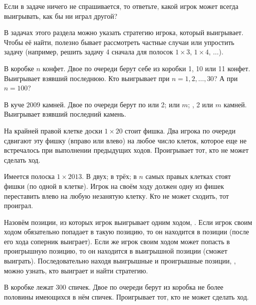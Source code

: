 \documentclass[a4paper,12pt]{article}
\begin{document}

{\small {\noindent} Если %
в задаче ничего не спрашивается, то
ответьте, какой игрок может всегда выигрывать,
как бы ни играл другой?}


{\small В задачах этого раздела можно указать стратегию
игрока, который выигрывает. Чтобы её найти, полезно бывает
рассмотреть частные случаи или упростить задачу (например, решить задачу
4 сначала для полосок $1\times3$, $1\times4$, $\dots$).
}

\vspace*{1truemm}



В коробке $n$ конфет. Двое по очереди берут себе из коробки
1, 10 или 11 конфет. Выигрывает взявший последнюю.
 Кто выигрывает при $n=1,2,\dots,30$?
  А при $n=100$?

В куче $2009$ камней. Двое по очереди берут по
 или 2;
 или $m$;
, 2 или $m$ камней.
Выигрывает взявший последний камень.

 На крайней правой клетке доски $1\times 20$ стоит фишка.
Два игрока по очереди сдвигают эту фишку (вправо или влево)
на любое число клеток, которое еще не встречалось при
выполнении предыдущих ходов. Проигрывает тот, кто не может
сделать ход.


Имеется полоска $1\times2013$.
 В двух;
 в трёх;
 в $n$ самых правых клетках стоят фишки (по одной в клетке).
Игрок на своём ходу должен одну из фишек переставить влево
на любую незанятую клетку. Кто не может сходить, тот
проиграл.

\vspace*{.5mm}
{\small
Назовём позиции, из которых игрок выигрывает одним ходом,
. Если игрок своим ходом обязательно попадает
в такую позицию, то он находится в  позиции
(после его хода соперник выиграет). %
Если же игрок своим ходом может попасть в проигрышную позицию,
то он находится в выигрышной позиции (сможет выиграть).
Последовательно находя выигрышные и проигрышные позиции,
,
можно узнать, кто выиграет и найти стратегию.
}

\vspace*{1mm}

В коробке лежат 300 спичек. Двое по очереди
берут из коробка не более половины имеющихся в нём спичек.
Проигрывает тот, кто не может сделать ход.
\end{document}
